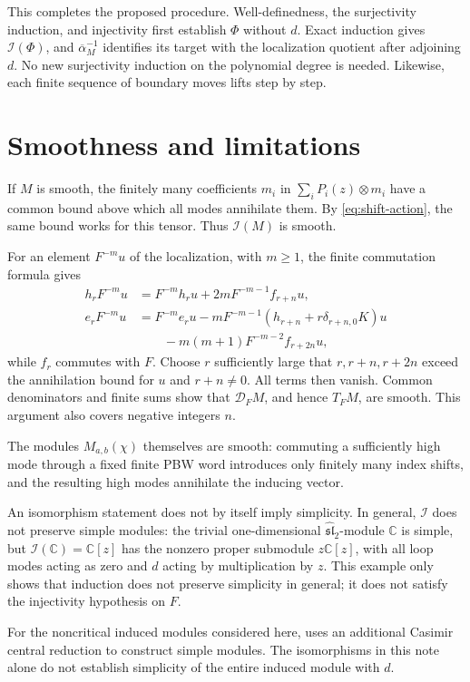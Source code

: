 \documentclass[11pt]{article}
\newcommand{\C}{\mathbb C}
\newcommand{\g}{\widehat{\mathfrak{sl}}_2}
\newcommand{\I}{\mathcal I}
\newcommand{\D}{\mathcal D}
\theoremstyle{definition}
\begin{document}
This completes the proposed procedure. Well-definedness, the
surjectivity induction, and injectivity first establish \(\Phi\)
without \(d\). Exact induction gives \(\I(\Phi)\), and
\(\overline\alpha_M^{-1}\) identifies its target with the localization
quotient after adjoining \(d\). No new surjectivity induction on the
polynomial degree is needed. Likewise, each finite sequence of
boundary moves lifts step by step.

\section{Smoothness and limitations}

If \(M\) is smooth, the finitely many coefficients \(m_i\) in
\(\sum_iP_i(z)\otimes m_i\) have a common bound above which all modes
annihilate them. By \eqref{eq:shift-action}, the same bound works
for this tensor. Thus \(\I(M)\) is smooth.

For an element \(F^{-m}u\) of the localization, with \(m\ge1\),
the finite commutation formula gives
\[
\begin{aligned}
 h_rF^{-m}u&=F^{-m}h_ru+2mF^{-m-1}f_{r+n}u,\\
 e_rF^{-m}u&=F^{-m}e_ru
       -mF^{-m-1}(h_{r+n}+r\delta_{r+n,0}K)u\\
 &\hspace{2em}-m(m+1)F^{-m-2}f_{r+2n}u,
\end{aligned}
\]
while \(f_r\) commutes with \(F\). Choose \(r\) sufficiently large
that \(r,r+n,r+2n\) exceed the annihilation bound for \(u\) and
\(r+n\ne0\). All terms then vanish. Common denominators and finite
sums show that \(\D_FM\), and hence \(T_FM\), are smooth. This
argument also covers negative integers \(n\).

The modules \(M_{a,b}(\chi)\) themselves are smooth: commuting a
sufficiently high mode through a fixed finite PBW word introduces
only finitely many index shifts, and the resulting high modes
annihilate the inducing vector.

An isomorphism statement does not by itself imply simplicity. In
general, \(\I\) does not preserve simple modules: the trivial
one-dimensional \(\g\)-module \(\C\) is simple, but
\(\I(\C)=\C[z]\) has the nonzero proper submodule \(z\C[z]\),
with all loop modes acting as zero and \(d\) acting by multiplication
by \(z\). This example only shows that induction does not preserve
simplicity in general; it does not satisfy the injectivity
hypothesis on \(F\).

For the noncritical induced modules considered here,
\cite[\S4.1]{FGXZ} uses an additional Casimir central reduction to
construct simple modules. The isomorphisms in this note alone do
not establish simplicity of the entire induced module with \(d\).
\end{document}
